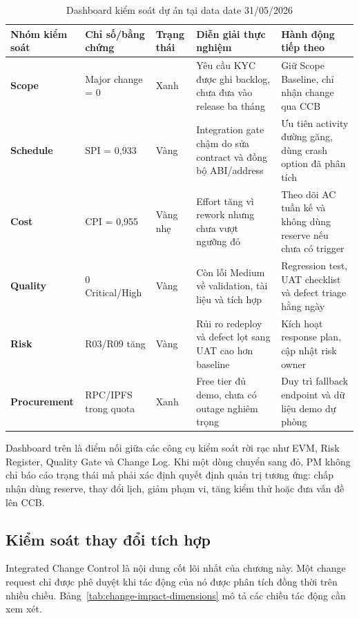\begin{table}[H]
\centering
\caption{Dashboard kiểm soát dự án tại data date 31/05/2026}
\label{tab:project-control-dashboard}
\small
\begin{tabularx}{\textwidth}{| >{\bfseries}p{2.1cm} | p{2.4cm} | p{1.4cm} | X | >{\raggedright\arraybackslash}p{3cm} |}
\hline
Nhóm kiểm soát & Chỉ số/bằng chứng & Trạng thái & Diễn giải thực nghiệm & Hành động tiếp theo \\
\hline
Scope & Major change = 0 & Xanh & Yêu cầu KYC được ghi backlog, chưa đưa vào release ba tháng & Giữ Scope Baseline, chỉ nhận change qua CCB \\ \hline
Schedule & SPI = 0,933 & Vàng & Integration gate chậm do sửa contract và đồng bộ ABI/address & Ưu tiên activity đường găng, dùng crash option đã phân tích \\ \hline
Cost & CPI = 0,955 & Vàng nhẹ & Effort tăng vì rework nhưng chưa vượt ngưỡng đỏ & Theo dõi AC tuần kế và không dùng reserve nếu chưa có trigger \\ \hline
Quality & 0 Critical/High & Vàng & Còn lỗi Medium về validation, tài liệu và tích hợp & Regression test, UAT checklist và defect triage hằng ngày \\ \hline
Risk & R03/R09 tăng & Vàng & Rủi ro redeploy và defect lọt sang UAT cao hơn baseline & Kích hoạt response plan, cập nhật risk owner \\ \hline
Procurement & RPC/IPFS trong quota & Xanh & Free tier đủ demo, chưa có outage nghiêm trọng & Duy trì fallback endpoint và dữ liệu demo dự phòng \\
\hline
\end{tabularx}
\end{table}

Dashboard trên là điểm nối giữa các công cụ kiểm soát rời rạc như EVM, Risk Register, Quality Gate và Change Log. Khi một dòng chuyển sang đỏ, PM không chỉ báo cáo trạng thái mà phải xác định quyết định quản trị tương ứng: chấp nhận dùng reserve, thay đổi lịch, giảm phạm vi, tăng kiểm thử hoặc đưa vấn đề lên CCB.

\subsection{Kiểm soát thay đổi tích hợp}

Integrated Change Control là nội dung cốt lõi nhất của chương này. Một change request chỉ được phê duyệt khi tác động của nó được phân tích đồng thời trên nhiều chiều. Bảng~\ref{tab:change-impact-dimensions} mô tả các chiều tác động cần xem xét.

